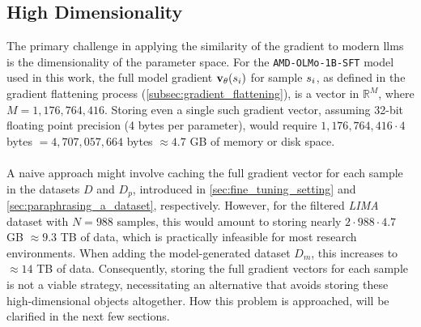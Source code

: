\subsection{High Dimensionality}\label{subsec:high_dimensionality}
The primary challenge in applying the similarity of the gradient to modern \acrlong{llm}s is the dimensionality of the parameter space. For the \texttt{AMD-OLMo-1B-SFT} model used in this work, the full model gradient $\vXsi[\theta]$ for sample $\si$, as defined in the gradient flattening process (\autoref{subsec:gradient_flattening}), is a vector in $\mathbb{R}^{M}$, where $M = 1{,}176{,}764{,}416$. Storing even a single such gradient vector, assuming 32-bit floating point precision (4 bytes per parameter), would require $1{,}176{,}764{,}416 \cdot 4$ bytes $= 4{,}707{,}057{,}664$ bytes $\approx 4.7$ GB of memory or disk space.
\\\\
A naive approach might involve caching the full gradient vector for each sample in the datasets $D$ and $D_p$, introduced in \autoref{sec:fine_tuning_setting} and \autoref{sec:paraphrasing_a_dataset}, respectively. However, for the filtered \emph{LIMA} dataset with $N=988$ samples, this would amount to storing nearly $2 \cdot 988 \cdot 4.7$ GB $\approx 9.3$ TB of data, which is practically infeasible for most research environments. When adding the model-generated dataset $D_m$, this increases to $\approx 14$ TB of data. Consequently, storing the full gradient vectors for each sample is not a viable strategy, necessitating an alternative that avoids storing these high-dimensional objects altogether. How this problem is approached, will be clarified in the next few sections.

